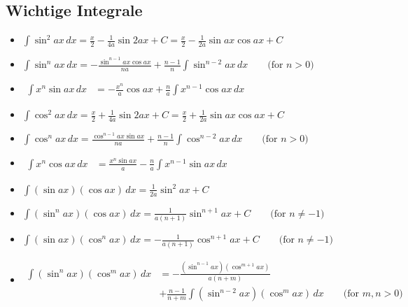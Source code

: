 \documentclass[25pt]{sciposter}
\begin{document}
\begin{multicols}{3}
\subsection*{Wichtige Integrale}

\begin{itemize}	
	
	\item ${\displaystyle \int \sin ^{2}{ax}\,dx={\frac {x}{2}}-{\frac {1}{4a}}\sin 2ax+C={\frac {x}{2}}-{\frac {1}{2a}}\sin ax\cos ax+C}$
	
	\item ${\displaystyle \int \sin ^{n}{ax}\,dx=-{\frac {\sin ^{n-1}ax\cos ax}{na}}+{\frac {n-1}{n}}\int \sin ^{n-2}ax\,dx\qquad {\mbox{(for }}n>0{\mbox{)}}}$
	
	\item ${\displaystyle {\begin{aligned}\int x^{n}\sin ax\,dx&=-{\frac {x^{n}}{a}}\cos ax+{\frac {n}{a}}\int x^{n-1}\cos ax\,dx\end{aligned}}}$
	
	\item ${\displaystyle \int \cos ^{2}{ax}\,dx={\frac {x}{2}}+{\frac {1}{4a}}\sin 2ax+C={\frac {x}{2}}+{\frac {1}{2a}}\sin ax\cos ax+C}$
	
	\item ${\displaystyle \int \cos ^{n}ax\,dx={\frac {\cos ^{n-1}ax\sin ax}{na}}+{\frac {n-1}{n}}\int \cos ^{n-2}ax\,dx\qquad {\mbox{(for }}n>0{\mbox{)}}}$
	
	\item ${\displaystyle {\begin{aligned}\int x^{n}\cos ax\,dx&={\frac {x^{n}\sin ax}{a}}-{\frac {n}{a}}\int x^{n-1}\sin ax\,dx\end{aligned}}}$
	
	
	
	
	
	\item ${\displaystyle \int (\sin ax)(\cos ax)\,dx={\frac {1}{2a}}\sin ^{2}ax+C}$
	
	\item ${\displaystyle \int (\sin ^{n}ax)(\cos ax)\,dx={\frac {1}{a(n+1)}}\sin ^{n+1}ax+C\qquad {\mbox{(for }}n\neq -1{\mbox{)}}}$
	
	\item ${\displaystyle \int (\sin ax)(\cos ^{n}ax)\,dx=-{\frac {1}{a(n+1)}}\cos ^{n+1}ax+C\qquad {\mbox{(for }}n\neq -1{\mbox{)}}}$
	
	\item $ {\displaystyle {\begin{aligned}\int (\sin ^{n}ax)(\cos ^{m}ax)\,dx&=-{\frac {(\sin ^{n-1}ax)(\cos ^{m+1}ax)}{a(n+m)}}\\&+{\frac {n-1}{n+m}}\int (\sin ^{n-2}ax)(\cos ^{m}ax)\,dx\qquad {\mbox{(for }}m,n>0{\mbox{)}}\end{aligned}}} $
	

\end{itemize}
\end{multicols}
\end{document}
